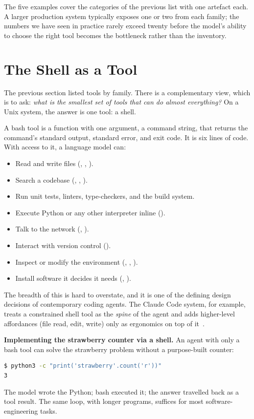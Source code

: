 The five examples cover the categories of the previous list with one
artefact each. A larger production system typically exposes one or
two from each family; the numbers we have seen in practice rarely
exceed twenty before the model's ability to choose the right tool
becomes the bottleneck rather than the inventory.

\section{The Shell as a Tool}
\label{sec:shell}

The previous section listed tools by family. There is a complementary
view, which is to ask: \emph{what is the smallest set of tools that
can do almost everything?} On a Unix system, the answer is one tool:
a shell.

A bash tool is a function with one argument, a command string, that
returns the command's standard output, standard error, and exit
code. It is six lines of code. With access to it, a language model
can:

\begin{itemize}[leftmargin=1.5em,topsep=0.2em,itemsep=0.1em]
\item Read and write files (, , ).
\item Search a codebase (, , ).
\item Run unit tests, linters, type-checkers, and the build system.
\item Execute Python or any other interpreter inline
  ().
\item Talk to the network (, ).
\item Interact with version control ().
\item Inspect or modify the environment (, ,
  ).
\item Install software it decides it needs (,
  ).
\end{itemize}

The breadth of this is hard to overstate, and it is one of the
defining design decisions of contemporary coding agents. The Claude
Code system, for example, treats a constrained shell tool as the
\emph{spine} of the agent and adds higher-level affordances (file
read, edit, write) only as ergonomics on top of it~\citep{liu2026claudecode}.

\begin{examplebox}
\small
\textbf{Implementing the strawberry counter via a shell.} An agent
with only a bash tool can solve the strawberry problem without a
purpose-built counter:

\begin{lstlisting}[language=bash]
$ python3 -c "print('strawberry'.count('r'))"
3
\end{lstlisting}

\noindent
The model wrote the Python; bash executed it; the answer travelled
back as a tool result. The same loop, with longer programs, suffices
for most software-engineering tasks.
\end{examplebox}


